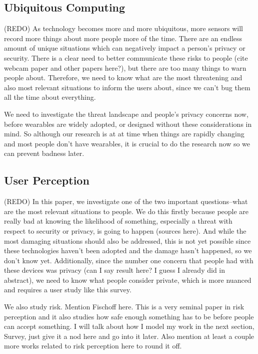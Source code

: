 \documentclass{acm_proc_article-sp}
\begin{document}
\subsection{Ubiquitous Computing}
(REDO) As technology becomes more and more ubiquitous, more sensors will record more things about more people more of the time. There are an endless amount of unique situations which can negatively impact a person's privacy or security. There is a clear need to better communicate these risks to people (cite webcam paper and other papers here?), but there are too many things to warn people about. Therefore, we need to know what are the most threatening and also most relevant situations to inform the users about, since we can't bug them all the time about everything. 

We need to investigate the threat landscape and people's privacy concerns now, before wearables are widely adopted, or designed without these considerations in mind. So although our research is at at time when things are rapidly changing and most people don't have wearables, it is crucial to do the research now so we can prevent badness later.

\subsection{User Perception}
(REDO) In this paper, we investigate one of the two important questions--what are the most relevant situations to people. We do this firstly because people are really bad at knowing the likelihood of something, especially a threat with respect to security or privacy, is going to happen (sources here). And while the most damaging situations should also be addressed, this is not yet possible since these technologies haven't been adopted and the damage hasn't happened, so we don't know yet. Additionally, since the number one concern that people had with these devices was privacy (can I say result here? I guess I already did in abstract), we need to know what people consider private, which is more nuanced and requires a user study like this survey. 

We also study risk. Mention Fischoff here. This is a very seminal paper in risk perception and it also studies how safe enough something has to be before people can accept something. I will talk about how I model my work in the next section, Survey, just give it a nod here and go into it later. Also mention at least a couple more works related to risk perception here to round it off. 
\end{document}

